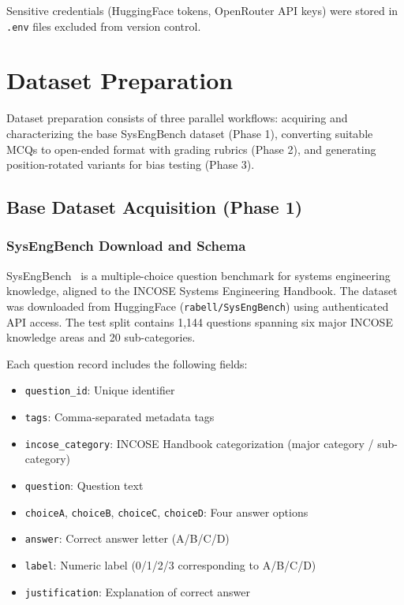 Sensitive credentials (HuggingFace tokens, OpenRouter API keys) were stored in \texttt{.env} files excluded from version control.

\section{Dataset Preparation}\label{sec:dataset_construction}

Dataset preparation consists of three parallel workflows: acquiring and characterizing the base SysEngBench dataset (Phase 1), converting suitable MCQs to open-ended format with grading rubrics (Phase 2), and generating position-rotated variants for bias testing (Phase 3).

\subsection{Base Dataset Acquisition (Phase 1)}\label{sec:phase1}

\subsubsection{SysEngBench Download and Schema}

SysEngBench~\citep{sysengbench_citation} is a multiple-choice question benchmark for systems engineering knowledge, aligned to the INCOSE Systems Engineering Handbook. The dataset was downloaded from HuggingFace (\texttt{rabell/SysEngBench}) using authenticated API access. The test split contains 1,144 questions spanning six major INCOSE knowledge areas and 20 sub-categories.

Each question record includes the following fields:
\begin{itemize}
    \item \texttt{question\_id}: Unique identifier
    \item \texttt{tags}: Comma-separated metadata tags
    \item \texttt{incose\_category}: INCOSE Handbook categorization (major category / sub-category)
    \item \texttt{question}: Question text
    \item \texttt{choiceA}, \texttt{choiceB}, \texttt{choiceC}, \texttt{choiceD}: Four answer options
    \item \texttt{answer}: Correct answer letter (A/B/C/D)
    \item \texttt{label}: Numeric label (0/1/2/3 corresponding to A/B/C/D)
    \item \texttt{justification}: Explanation of correct answer
\end{itemize}

